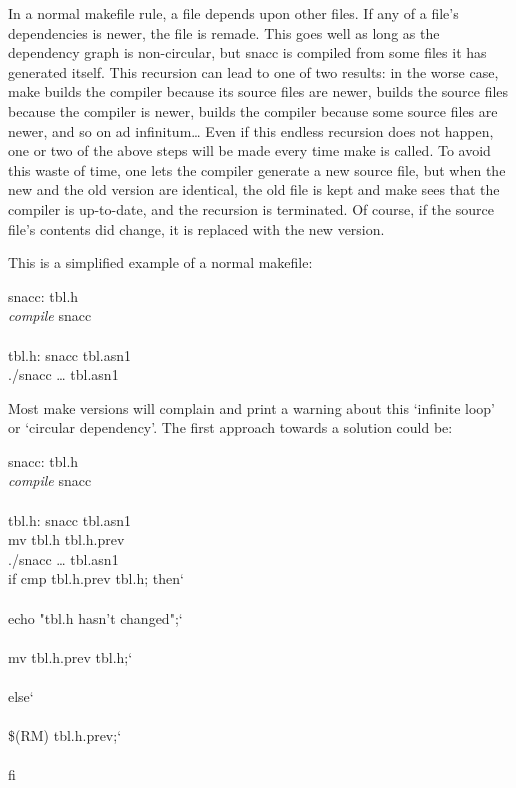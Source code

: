 In a normal makefile rule, a file depends upon other files.
If any of a file's dependencies is newer, the file is remade.
This goes well as long as the dependency graph is non-circular, but snacc is compiled from some files it has generated itself.
This recursion can lead to one of two results: in the worse case, {\ufn make} builds the compiler because its source files are newer, builds the source files because the compiler is newer, builds the compiler because some source files are newer, and so on ad infinitum\dots{}
Even if this endless recursion does not happen, one or two of the above steps will be made every time {\ufn make} is called.
To avoid this waste of time, one lets the compiler generate a new source file, but when the new and the old version are identical, the old file is kept and {\ufn make} sees that the compiler is up-to-date, and the recursion is terminated.
Of course, if the source file's contents did change, it is replaced with the new version.

This is a simplified example of a normal makefile:

\begin{Makefile}
snacc:		\>tbl.h\\
		\>\emph{compile} snacc\\
\\
tbl.h:		\>snacc tbl.asn1\\
		\>./snacc \dots{} tbl.asn1\\
\end{Makefile}

Most {\ufn make} versions will complain and print a warning about this `infinite loop' or `circular dependency'.
The first approach towards a solution could be:

\begin{Makefile}
snacc:		\>tbl.h\\
		\>\emph{compile} snacc\\
\\
tbl.h:		\>snacc tbl.asn1\\
		\>mv tbl.h tbl.h.prev\\
		\>./snacc \dots{} tbl.asn1\\
		\>if cmp tbl.h.prev tbl.h; then\char`\\\\
		\>\>  echo "tbl.h hasn't changed";\char`\\\\
		\>\>  mv tbl.h.prev tbl.h;\char`\\\\
		\>else\char`\\\\
		\>\>  \$(RM) tbl.h.prev;\char`\\\\
		\>fi\\
\end{Makefile}

